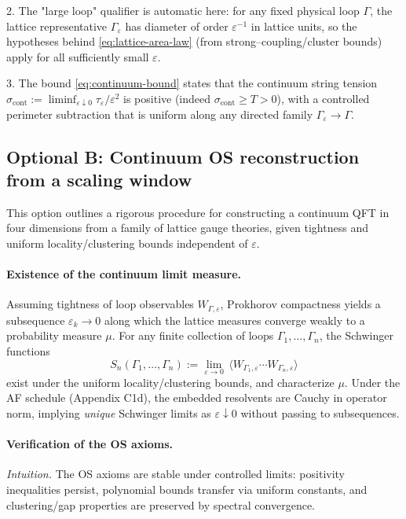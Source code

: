\documentclass[11pt]{amsart}
\begin{document}
2. The "large loop" qualifier is automatic here: for any fixed physical loop $\Gamma$, the lattice representative $\Gamma_\varepsilon$ has diameter of order $\varepsilon^{-1}$ in lattice units, so the hypotheses behind \eqref{eq:lattice-area-law} (from strong--coupling/cluster bounds) apply for all sufficiently small $\varepsilon$.

3. The bound \eqref{eq:continuum-bound} states that the continuum string tension $\sigma_{\text{cont}}:=\liminf_{\varepsilon\downarrow 0}\tau_\varepsilon/\varepsilon^2$ is positive (indeed $\sigma_{\text{cont}}\ge T>0$), with a controlled perimeter subtraction that is uniform along any directed family $\Gamma_\varepsilon\to\Gamma$.

\subsection*{Optional B: Continuum OS reconstruction from a scaling window}

This option outlines a rigorous procedure for constructing a continuum QFT in four dimensions from a family of lattice gauge theories, given tightness and uniform locality/clustering bounds independent of $\varepsilon$.

\paragraph{Existence of the continuum limit measure.}
Assuming tightness of loop observables $W_{\Gamma,\varepsilon}$, Prokhorov compactness yields a subsequence $\varepsilon_k\to 0$ along which the lattice measures converge weakly to a probability measure $\mu$. For any finite collection of loops $\Gamma_1,\dots,\Gamma_n$, the Schwinger functions
\[
  S_n(\Gamma_1,\dots,\Gamma_n):=\lim_{\varepsilon\to 0}\,\langle W_{\Gamma_1,\varepsilon}\cdots W_{\Gamma_n,\varepsilon}\rangle
\]
exist under the uniform locality/clustering bounds, and characterize $\mu$.
Under the AF schedule (Appendix C1d), the embedded resolvents are Cauchy in operator norm, implying \emph{unique} Schwinger limits as $\varepsilon\downarrow 0$ without passing to subsequences.

\paragraph{Verification of the OS axioms.}
\emph{Intuition.} The OS axioms are stable under controlled limits: positivity inequalities persist, polynomial bounds transfer via uniform constants, and clustering/gap properties are preserved by spectral convergence.
\end{document}
